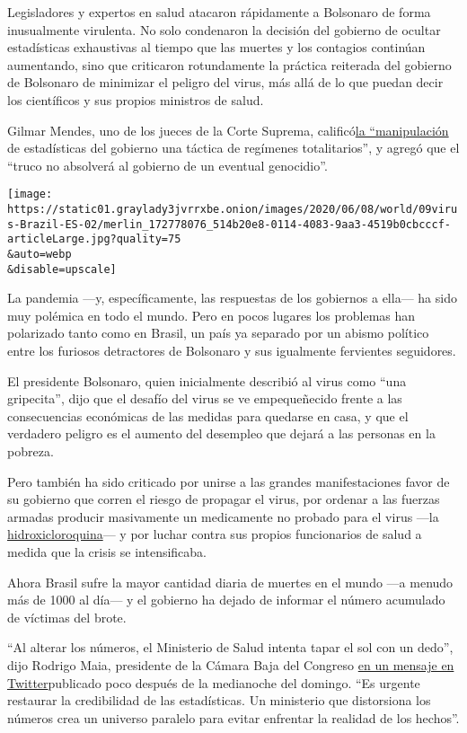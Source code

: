 Legisladores y expertos en salud atacaron rápidamente a Bolsonaro de
forma inusualmente virulenta. No solo condenaron la decisión del
gobierno de ocultar estadísticas exhaustivas al tiempo que las muertes y
los contagios continúan aumentando, sino que criticaron rotundamente la
práctica reiterada del gobierno de Bolsonaro de minimizar el peligro del
virus, más allá de lo que puedan decir los científicos y sus propios
ministros de salud.

Gilmar Mendes, uno de los jueces de la Corte Suprema,
calificó\href{https://twitter.com/gilmarmendes/status/1269399102242119686?s=20}{la
``manipulación} de estadísticas del gobierno una táctica de regímenes
totalitarios'', y agregó que el ``truco no absolverá al gobierno de un
eventual genocidio''.

\texttt{[image: https://static01.graylady3jvrrxbe.onion/images/2020/06/08/world/09virus-Brazil-ES-02/merlin\_172778076\_514b20e8-0114-4083-9aa3-4519b0cbcccf-articleLarge.jpg?quality=75\\\&auto=webp\\\&disable=upscale]}

La pandemia ---y, específicamente, las respuestas de los gobiernos a
ella--- ha sido muy polémica en todo el mundo. Pero en pocos lugares los
problemas han polarizado tanto como en Brasil, un país ya separado por
un abismo político entre los furiosos detractores de Bolsonaro y sus
igualmente fervientes seguidores.

El presidente Bolsonaro, quien inicialmente describió al virus como
``una gripecita'', dijo que el desafío del virus se ve empequeñecido
frente a las consecuencias económicas de las medidas para quedarse en
casa, y que el verdadero peligro es el aumento del desempleo que dejará
a las personas en la pobreza.

Pero también ha sido criticado por unirse a las grandes manifestaciones
favor de su gobierno que corren el riesgo de propagar el virus, por
ordenar a las fuerzas armadas producir masivamente un medicamente no
probado para el virus ---la
\href{https://www.nytimes3xbfgragh.onion/2020/06/03/health/hydroxychloroquine-coronavirus-trump.html}{hidroxicloroquina}---
y por luchar contra sus propios funcionarios de salud a medida que la
crisis se intensificaba.

Ahora Brasil sufre la mayor cantidad diaria de muertes en el mundo ---a
menudo más de 1000 al día--- y el gobierno ha dejado de informar el
número acumulado de víctimas del brote.

``Al alterar los números, el Ministerio de Salud intenta tapar el sol
con un dedo'', dijo Rodrigo Maia, presidente de la Cámara Baja del
Congreso
\href{https://twitter.com/RodrigoMaia/status/1269841732780294144?s=20}{en
un mensaje en Twitter}publicado poco después de la medianoche del
domingo. ``Es urgente restaurar la credibilidad de las estadísticas. Un
ministerio que distorsiona los números crea un universo paralelo para
evitar enfrentar la realidad de los hechos''.

